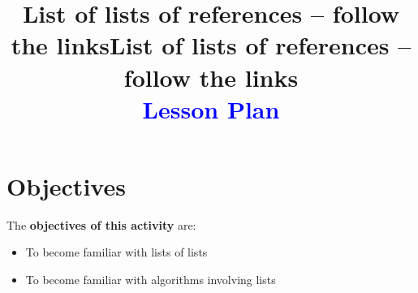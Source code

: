 \documentclass[a4paper,10pt]{article}
\title{List of lists of references -- follow the links\solution}
\title{List of lists of references -- follow the links\\\textcolor{blue}{Lesson Plan}}
\date{}
\begin{document}
\maketitle



\section*{Objectives}

\noindent The \textbf{objectives of this activity} are:
\begin{itemize}
  \item To become familiar with lists of lists
  \item To become familiar with algorithms involving lists
\end{itemize}
\end{document}
